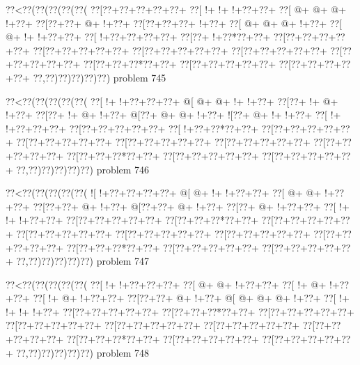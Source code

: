 \vbox{\vbox{\goo
\0??<\0??(\0??(\0??(\0??(\0??(
\0??[\0??+\0??+\0??+\0??+\0??+
\0??[\- !+\- !+\- !+\0??+\0??+
\0??[\- @+\- @+\- @+\- !+\0??+
\0??[\0??+\0??+\- @+\- !+\0??+
\0??[\0??+\0??+\0??+\- !+\0??+
\0??[\- @+\- @+\- @+\- !+\0??+
\0??[\- @+\- !+\- !+\0??+\0??+
\0??[\- !+\0??+\0??+\0??+\0??+
\0??[\0??+\- !+\0??*\0??+\0??+
\0??[\0??+\0??+\0??+\0??+\0??+
\0??[\0??+\0??+\0??+\0??+\0??+
\0??[\0??+\0??+\0??+\0??+\0??+
\0??[\0??+\0??+\0??+\0??+\0??+
\0??[\0??+\0??+\0??+\0??+\0??+
\0??[\0??+\0??+\0??*\0??+\0??+
\0??[\0??+\0??+\0??+\0??+\0??+
\0??[\0??+\0??+\0??+\0??+\0??+
\0??,\0??)\0??)\0??)\0??)\0??)
}
\hfil problem 745\hfil\break
}

\vbox{\vbox{\goo
\0??<\0??(\0??(\0??(\0??(\0??(
\0??[\- !+\- !+\0??+\0??+\0??+
\- @[\- @+\- @+\- !+\- !+\0??+
\0??[\0??+\- !+\- @+\- !+\0??+
\0??[\0??+\- !+\- @+\- !+\0??+
\- @[\0??+\- @+\- @+\- !+\0??+
\- ![\0??+\- @+\- !+\- !+\0??+
\0??[\- !+\- !+\0??+\0??+\0??+
\0??[\0??+\0??+\0??+\0??+\0??+
\0??[\- !+\0??+\0??*\0??+\0??+
\0??[\0??+\0??+\0??+\0??+\0??+
\0??[\0??+\0??+\0??+\0??+\0??+
\0??[\0??+\0??+\0??+\0??+\0??+
\0??[\0??+\0??+\0??+\0??+\0??+
\0??[\0??+\0??+\0??+\0??+\0??+
\0??[\0??+\0??+\0??*\0??+\0??+
\0??[\0??+\0??+\0??+\0??+\0??+
\0??[\0??+\0??+\0??+\0??+\0??+
\0??,\0??)\0??)\0??)\0??)\0??)
}
\hfil problem 746\hfil\break
}

\vbox{\vbox{\goo
\0??<\0??(\0??(\0??(\0??(\0??(
\- ![\- !+\0??+\0??+\0??+\0??+
\- @[\- @+\- !+\- !+\0??+\0??+
\0??[\- @+\- @+\- !+\0??+\0??+
\0??[\0??+\0??+\- @+\- !+\0??+
\- @[\0??+\0??+\- @+\- !+\0??+
\0??[\0??+\- @+\- !+\0??+\0??+
\0??[\- !+\- !+\- !+\0??+\0??+
\0??[\0??+\0??+\0??+\0??+\0??+
\0??[\0??+\0??+\0??*\0??+\0??+
\0??[\0??+\0??+\0??+\0??+\0??+
\0??[\0??+\0??+\0??+\0??+\0??+
\0??[\0??+\0??+\0??+\0??+\0??+
\0??[\0??+\0??+\0??+\0??+\0??+
\0??[\0??+\0??+\0??+\0??+\0??+
\0??[\0??+\0??+\0??*\0??+\0??+
\0??[\0??+\0??+\0??+\0??+\0??+
\0??[\0??+\0??+\0??+\0??+\0??+
\0??,\0??)\0??)\0??)\0??)\0??)
}
\hfil problem 747\hfil\break
}

\vbox{\vbox{\goo
\0??<\0??(\0??(\0??(\0??(\0??(
\0??[\- !+\- !+\0??+\0??+\0??+
\0??[\- @+\- @+\- !+\0??+\0??+
\0??[\- !+\- @+\- !+\0??+\0??+
\0??[\- !+\- @+\- !+\0??+\0??+
\0??[\0??+\0??+\- @+\- !+\0??+
\- @[\- @+\- @+\- @+\- !+\0??+
\0??[\- !+\- !+\- !+\- !+\0??+
\0??[\0??+\0??+\0??+\0??+\0??+
\0??[\0??+\0??+\0??*\0??+\0??+
\0??[\0??+\0??+\0??+\0??+\0??+
\0??[\0??+\0??+\0??+\0??+\0??+
\0??[\0??+\0??+\0??+\0??+\0??+
\0??[\0??+\0??+\0??+\0??+\0??+
\0??[\0??+\0??+\0??+\0??+\0??+
\0??[\0??+\0??+\0??*\0??+\0??+
\0??[\0??+\0??+\0??+\0??+\0??+
\0??[\0??+\0??+\0??+\0??+\0??+
\0??,\0??)\0??)\0??)\0??)\0??)
}
\hfil problem 748\hfil\break
}

